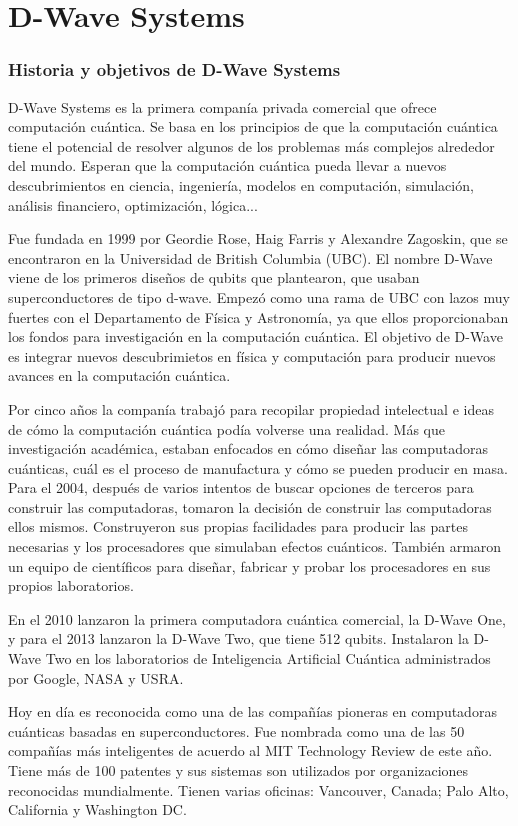\documentclass[11pt,a4paper]{article}
\begin{document}
\part{D-Wave Systems}
\section*{Historia y objetivos de D-Wave Systems}
D-Wave Systems es la primera companía privada comercial que ofrece computación cuántica. Se basa en los principios de que la computación cuántica tiene el potencial de resolver algunos de los problemas más complejos alrededor del mundo. Esperan que la computación cuántica pueda llevar a nuevos descubrimientos en ciencia, ingeniería, modelos en computación, simulación, análisis financiero, optimización, lógica...

Fue fundada en 1999 por Geordie Rose, Haig Farris y Alexandre Zagoskin, que se encontraron en la Universidad de British Columbia (UBC). El nombre D-Wave viene de los primeros diseños de qubits que plantearon, que usaban superconductores de tipo d-wave. Empezó como una rama de UBC con lazos muy fuertes con el Departamento de Física y Astronomía, ya que ellos proporcionaban los fondos para investigación en la computación cuántica. El objetivo de D-Wave es integrar nuevos descubrimietos en física y computación para producir nuevos avances en la computación cuántica.

Por cinco años la companía trabajó para recopilar propiedad intelectual e ideas de cómo la computación cuántica podía volverse una realidad. Más que investigación académica, estaban enfocados en cómo diseñar las computadoras cuánticas, cuál es el proceso de manufactura y cómo se pueden producir en masa. 
Para el 2004, después de varios intentos de buscar opciones de terceros para construir las computadoras, tomaron la decisión de construir las computadoras ellos mismos. Construyeron sus propias facilidades para producir las partes necesarias y los procesadores que simulaban efectos cuánticos. También armaron un equipo de científicos para diseñar, fabricar y probar los procesadores en sus propios laboratorios. 

En el 2010 lanzaron la primera computadora cuántica comercial, la D-Wave One, y para el 2013 lanzaron la D-Wave Two, que tiene 512 qubits. Instalaron la D-Wave Two en los laboratorios de Inteligencia Artificial Cuántica administrados por Google, NASA y USRA. 

Hoy en día es reconocida como una de las compañías pioneras en computadoras cuánticas basadas en superconductores. Fue nombrada como una de las 50 compañías más inteligentes de acuerdo al MIT Technology Review de este año. Tiene más de 100 patentes y sus sistemas son utilizados por organizaciones reconocidas mundialmente. Tienen varias oficinas: Vancouver, Canada; Palo Alto, California y Washington DC. 
\end{document}
